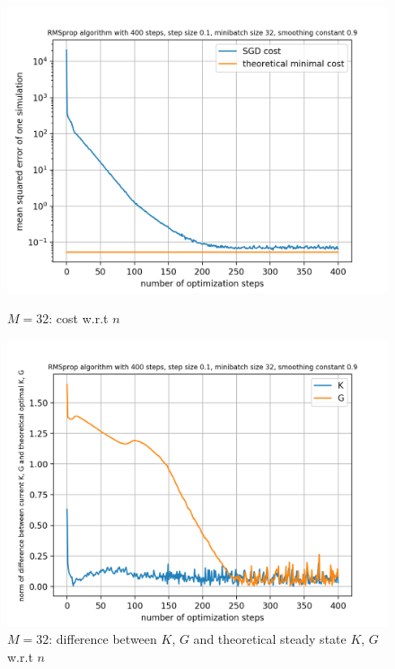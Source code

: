 \documentclass{article}
\begin{document}
\begin{figure}[h!]
	\centering
	\begin{minipage}[t]{.28\paperwidth}
		\centering
		\includegraphics[width=1.0\textwidth]{Figures/M32.png}
		\caption{$M=32$: cost w.r.t $n$}
	\end{minipage}%
	\begin{minipage}[t]{.28\paperwidth}
		\centering
		\includegraphics[width=1.0\textwidth]{Figures/d_M32.png}
		\caption{$M=32$: difference between $K$, $G$ and theoretical steady state $K$, $G$ w.r.t $n$}
	\end{minipage}%
	\begin{minipage}[t]{.28\paperwidth}
		\centering

\end{minipage}
\end{figure}
\end{document}
